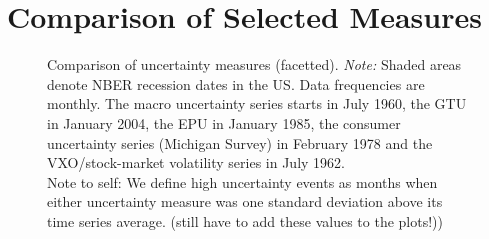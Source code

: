 \documentclass[a4paper,12pt,oneside,pointednumbers,bibtotoc,bigheadings,liststotoc]{scrbook}
\begin{document}
\section{Comparison of Selected Measures}
\begin{figure}[!ht]
   \centering
   \setlength\fboxsep{0pt}
   \setlength\fboxrule{0pt}
      \caption[Comparison of uncertainty measures (facetted).]{Comparison of uncertainty measures (facetted).
      \textit{Note:} Shaded areas denote NBER recession dates in the US. Data frequencies are monthly. The macro uncertainty series starts in July 1960, the GTU in January 2004, the EPU in January 1985, the consumer uncertainty series (Michigan Survey) in February 1978 and the VXO/stock-market volatility series in July 1962.\\
      Note to self: We define high uncertainty events as months when either uncertainty measure was one standard deviation above its time series average. (still have to add these values to the plots!))}   \label{fig:comparison_plot}
\end{figure}
\end{document}
